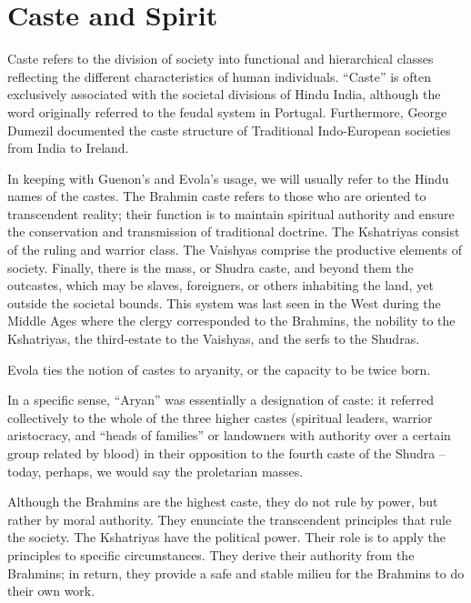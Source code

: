 \section{Caste and Spirit}

Caste refers to the division of society into functional and hierarchical classes reflecting the different characteristics of human individuals. ``Caste'' is often exclusively associated with the societal divisions of Hindu India, although the word originally referred to the feudal system in Portugal. Furthermore, George Dumezil documented the caste structure of Traditional Indo-European societies from India to Ireland.

In keeping with Guenon's and Evola's usage, we will usually refer to the Hindu names of the castes. The Brahmin caste refers to those who are oriented to transcendent reality; their function is to maintain spiritual authority and ensure the conservation and transmission of traditional doctrine. The Kshatriyas consist of the ruling and warrior class. The Vaishyas comprise the productive elements of society. Finally, there is the mass, or Shudra caste, and beyond them the outcastes, which may be slaves, foreigners, or others inhabiting the land, yet outside the societal bounds. This system was last seen in the West during the Middle Ages where the clergy corresponded to the Brahmins, the nobility to the Kshatriyas, the third-estate to the Vaishyas, and the serfs to the Shudras.

Evola ties the notion of castes to aryanity, or the capacity to be twice born.

\begin{quotex}
In a specific sense, ``Aryan'' was essentially a designation of caste: it referred collectively to the whole of the three higher castes (spiritual leaders, warrior aristocracy, and ``heads of families'' or landowners with authority over a certain group related by blood) in their opposition to the fourth caste of the Shudra -- today, perhaps, we would say the proletarian masses.


\end{quotex}

Although the Brahmins are the highest caste, they do not rule by power, but rather by moral authority. They enunciate the transcendent principles that rule the society. The Kshatriyas have the political power. Their role is to apply the principles to specific circumstances. They derive their authority from the Brahmins; in return, they provide a safe and stable milieu for the Brahmins to do their own work.

